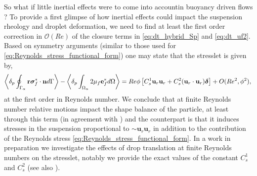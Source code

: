 So what if little inertial effects were to come into accountin buoyancy driven flows ?
To provide a first glimpse of how inertial effects could impact the suspension rheology and droplet deformation, we need to find at least the first order correction in $\mathcal{O}(Re)$ of the closure terms in \ref{eq:dt_hybrid_Sp} and \ref{eq:dt_uf2}. 
Based on symmetry arguments (similar to those used for \ref{eq:Reynolds_stress_functional_form}) one may state that the stresslet is given by, 
\begin{equation}
    \left<\delta_{p} \oint_{\Gamma_{\alpha}} \textbf{r}\bm\sigma^*_f\cdot \textbf{n} d\Gamma\right>
    -\left<\delta_{p} \int_{\Omega_{\alpha}} 2\mu_f\textbf{e}^*_f d\Omega\right>
    =
    Re \phi 
    \left[
       C_s^1 \textbf{u}_{r}\textbf{u}_{r} 
    +  C_s^2 (\textbf{u}_{r}\cdot \textbf{u}_{r})\bm\delta
    \right]
    + O(Re^2,\phi^2),
    \\
\end{equation}
at the first order in Reynolds number. 
We conclude that at finite Reynolds number relative motions impact the shape balance of the particle, at least through this term (in agreement with \citet{taylor1964deformation}) and the counterpart is that it induces stresses in the suspension proportional to $\sim \textbf{u}_r\textbf{u}_r$ in addition to the contribution of the Reynolds stress \eqref{eq:Reynolds_stress_functional_form}. 
In a work in preparation we investigate the effects of drop translation at finite Reynolds numbers on the stresslet, notably we provide the exact values of the constant $C_s^{1}$ and $C_s^{2}$ (see also \citet{fintzi2025}). 
 


